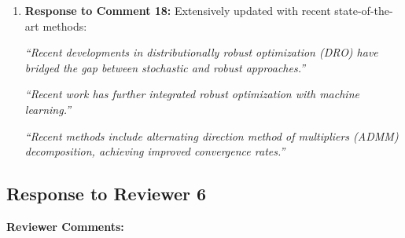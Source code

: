 \documentclass[journal,twoside,web]{ieeecolor}
\begin{document}
\begin{enumerate}
\item \textbf{Response to Comment 18:} Extensively updated with recent state-of-the-art methods:

{\color{revisionblue}\textit{``Recent developments in distributionally robust optimization (DRO) have bridged the gap between stochastic and robust approaches.''}}

{\color{revisionblue}\textit{``Recent work has further integrated robust optimization with machine learning.''}}

{\color{revisionblue}\textit{``Recent methods include alternating direction method of multipliers (ADMM) decomposition, achieving improved convergence rates.''}}
\end{enumerate}
\subsection*{Response to Reviewer 6}

\noindent\textbf{Reviewer Comments:}
\end{document}
